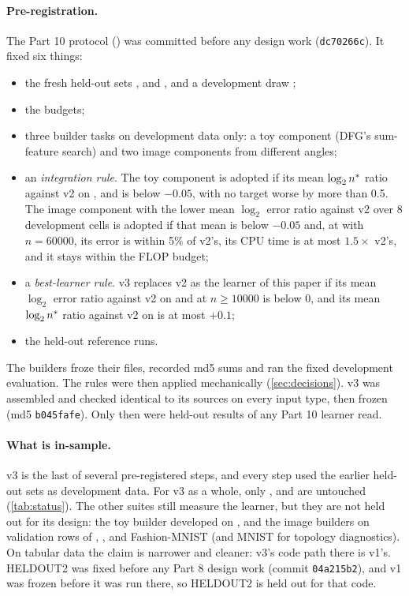 \paragraph{Pre-registration.} The Part 10 protocol () was committed before any design work (\texttt{dc70266c}). It fixed six things:
\begin{itemize}
\item the fresh held-out sets ,  and , and a development draw ;
\item the budgets;
\item three builder tasks on development data only: a toy component (DFG's sum-feature search) and two image components from different angles;
\item an \emph{integration rule}. The toy component is adopted if its mean $\log_2n^{*}$ ratio against v2 on ,  and  is below $-0.05$, with no target worse by more than 0.5. The image component with the lower mean $\log_2$ error ratio against v2 over 8 development cells is adopted if that mean is below $-0.05$ and, at  with $n=60000$, its error is within 5\% of v2's, its CPU time is at most $1.5\times$ v2's, and it stays within the FLOP budget;
\item a \emph{best-learner rule}. v3 replaces v2 as the learner of this paper if its mean $\log_2$ error ratio against v2 on  and  at $n\ge10000$ is below 0, and its mean $\log_2n^{*}$ ratio against v2 on  is at most $+0.1$;
\item the held-out reference runs.
\end{itemize}
The builders froze their files, recorded md5 sums and ran the fixed development evaluation. The rules were then applied mechanically (\cref{sec:decisions}). v3 was assembled and checked identical to its sources on every input type, then frozen (md5 \texttt{b045fafe}). Only then were held-out results of any Part 10 learner read.

\paragraph{What is in-sample.} v3 is the last of several pre-registered steps, and every step used the earlier held-out sets as development data. For v3 as a whole, only ,  and  are untouched (\cref{tab:status}). The other suites still measure the learner, but they are not held out for its design: the toy builder developed on , and the image builders on validation rows of , ,  and Fashion-MNIST (and MNIST for topology diagnostics). On tabular data the claim is narrower and cleaner: v3's code path there is v1's. HELDOUT2 was fixed before any Part 8 design work (commit \texttt{04a215b2}), and v1 was frozen before it was run there, so HELDOUT2 is held out for that code.
